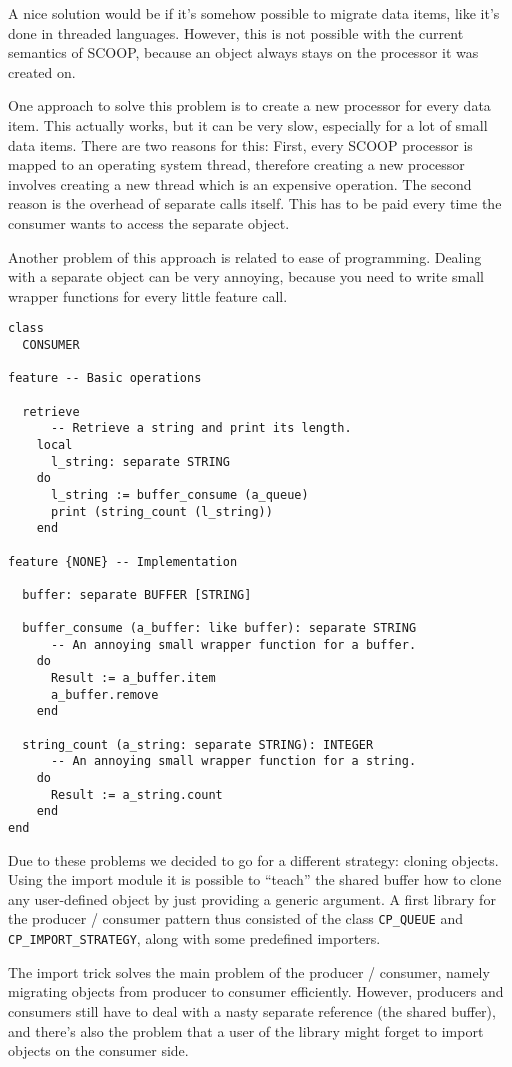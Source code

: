 \documentclass[a4paper,10pt]{report}
\begin{document}
A nice solution would be if it's somehow possible to migrate data items, like it's done in threaded languages.
However, this is not possible with the current semantics of SCOOP, because an object always stays on the processor it was created on.

One approach to solve this problem is to create a new processor for every data item.
This actually works, but it can be very slow, especially for a lot of small data items.
There are two reasons for this:
First, every SCOOP processor is mapped to an operating system thread, therefore creating a new processor involves creating a new thread which is an expensive operation.
The second reason is the overhead of separate calls itself.
This has to be paid every time the consumer wants to access the separate object.

Another problem of this approach is related to ease of programming.
Dealing with a separate object can be very annoying, because you need to write small wrapper functions for every little feature call.

\begin{lstlisting}
class
  CONSUMER

feature -- Basic operations
  
  retrieve
      -- Retrieve a string and print its length.
    local
      l_string: separate STRING
    do
      l_string := buffer_consume (a_queue)
      print (string_count (l_string))
    end
    
feature {NONE} -- Implementation
  
  buffer: separate BUFFER [STRING]

  buffer_consume (a_buffer: like buffer): separate STRING
      -- An annoying small wrapper function for a buffer.
    do
      Result := a_buffer.item
      a_buffer.remove
    end
    
  string_count (a_string: separate STRING): INTEGER
      -- An annoying small wrapper function for a string.
    do
      Result := a_string.count
    end
end
\end{lstlisting}


Due to these problems we decided to go for a different strategy: cloning objects.
Using the import module it is possible to ``teach'' the shared buffer how to clone any user-defined object by just providing a generic argument.
A first library for the producer / consumer pattern thus consisted of the class \lstinline!CP_QUEUE! and \lstinline!CP_IMPORT_STRATEGY!, along with some predefined importers.

The import trick solves the main problem of the producer / consumer, namely migrating objects from producer to consumer efficiently.
However, producers and consumers still have to deal with a nasty separate reference (the shared buffer), and there's also the problem that a user of the library might forget to import objects on the consumer side.
\end{document}
